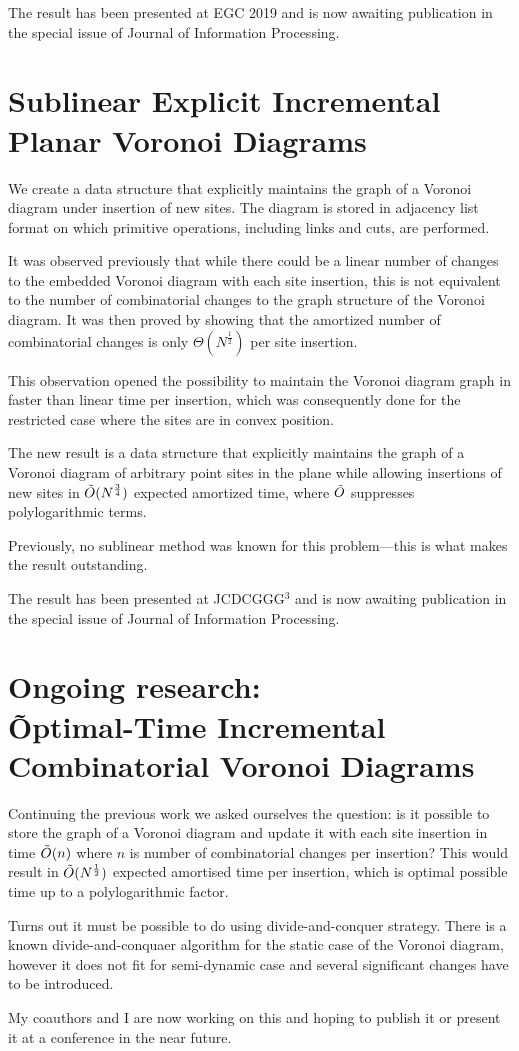 \documentclass[a4paper,11pt]{article}
\theoremstyle{definition}
\begin{document}
The result has been presented at EGC 2019 and is now awaiting publication in the special issue of Journal of Information Processing.

\section{Sublinear Explicit Incremental Planar Voronoi Diagrams}

We create a data structure that explicitly maintains the graph of a Voronoi diagram under insertion of new sites. The diagram is stored in adjacency list format on which primitive operations, including links and cuts, are performed.

It was observed previously that while there could be a linear number of changes to the embedded Voronoi diagram with each site insertion, this is not equivalent to the number of combinatorial changes to the graph structure of the Voronoi diagram.
It was then proved by showing that the amortized number of combinatorial changes is only $\Theta(N^{\frac 12})$ per site insertion.

This observation opened the possibility to maintain the Voronoi diagram graph in faster than linear time per insertion, which was consequently done for the restricted case where the sites are in convex position.

The new result is a data structure that explicitly maintains the graph of a Voronoi diagram of arbitrary point sites in the plane while allowing insertions of new sites in $\tilde O (N^{\frac 34})$ expected amortized time, where $\tilde O$ suppresses polylogarithmic terms. 

Previously, no sublinear method was known for this problem—this is what makes the result outstanding.

The result has been presented at JCDCGGG$^3$ and is now awaiting publication in the special issue of Journal of Information Processing.

\section{Ongoing research: \\
	\~Optimal-Time Incremental Combinatorial Voronoi Diagrams}

Continuing the previous work we asked ourselves the question: is it possible to store the graph of a Voronoi diagram and update it with each site insertion in time $\tilde O(n)$ where $n$ is number of combinatorial changes per insertion? This would result in $\tilde O(N^\frac12)$ expected amortised time per insertion, which is optimal possible time up to a polylogarithmic factor.

Turns out it must be possible to do using divide-and-conquer strategy. There is a known divide-and-conquaer algorithm for the static case of the Voronoi diagram, however it does not fit for semi-dynamic case and several significant changes have to be introduced.

My coauthors and I are now working on this and hoping to publish it or present it at a conference in the near future.
\end{document}
